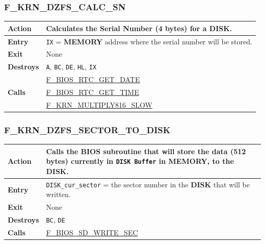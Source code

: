 \documentclass[a4paper,11pt]{article}
\begin{document}
        \subsubsection{F\_KRN\_DZFS\_CALC\_SN}
        \label{func:fkrndzfscalcsn}
        \begin{tabular}{l p{9cm}}
            \hline\textbf{Action}
            & Calculates the Serial Number (4 bytes) for a \textbf{DISK}.\\
            \hline\textbf{Entry}
            & \texttt{IX} = \textbf{MEMORY} address where the serial number will
            be stored.\\
            \hline\textbf{Exit} & None\\
            \hline\textbf{Destroys} & \texttt{A}, \texttt{BC}, \texttt{DE},
            \texttt{HL}, \texttt{IX} \\
            \hline\multirow[t]{3}{4em}{\textbf{Calls}}
            & \hyperref[func:fbiosrtcgetdate]{F\_BIOS\_RTC\_GET\_DATE}\\
            & \hyperref[func:fbiosrtcgettime]{F\_BIOS\_RTC\_GET\_TIME}\\
            & \hyperref[func:fkrnmultiply816slow]{F\_KRN\_MULTIPLY816\_SLOW}\\
            \hline
        \end{tabular}

        \subsubsection{F\_KRN\_DZFS\_SECTOR\_TO\_DISK}
        \label{func:fkrndzfssectortodisk}
        \begin{tabular}{l p{9cm}}
            \hline\textbf{Action}
            & Calls the \textbf{BIOS} subroutine that will store the data 
            (512 bytes) currently in \texttt{DISK Buffer} in \textbf{MEMORY},
            to the \textbf{DISK}.\\
            \hline\textbf{Entry}
            & \texttt{DISK\_cur\_sector} = the sector number in the \textbf{DISK}
            that will be written.\\
            \hline\textbf{Exit} & None\\
            \hline\textbf{Destroys} & \texttt{BC}, \texttt{DE}\\
            \hline\textbf{Calls}
            & \hyperref[func:fbiosdiskwritesec]{F\_BIOS\_SD\_WRITE\_SEC}\\
            \hline
        \end{tabular}
\end{document}
